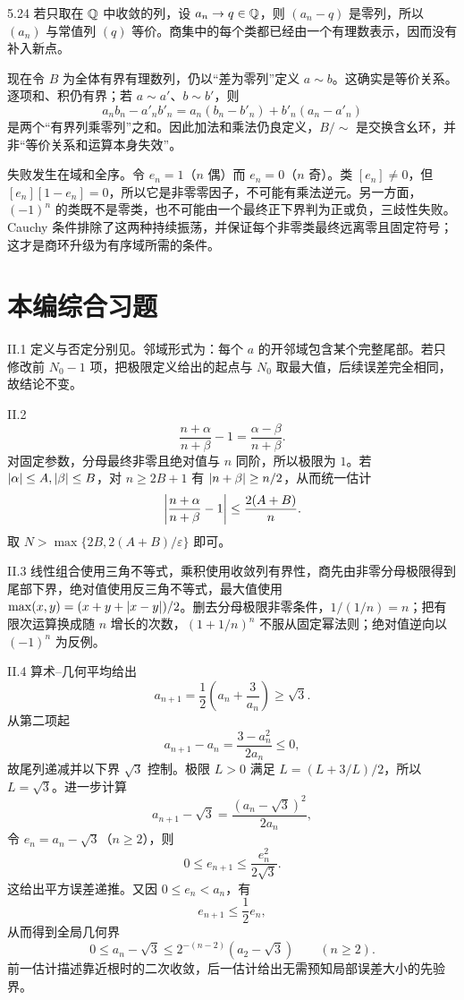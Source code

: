 \begin{solution}{5.24}
若只取在 \(\mathbb{Q}\) 中收敛的列，设 \(a_n\to q\in\mathbb{Q}\)，则
\((a_n-q)\) 是零列，所以 \((a_n)\) 与常值列 \((q)\) 等价。商集中的每个类都已经由一个有理数表示，因而没有补入新点。

现在令 \(B\) 为全体有界有理数列，仍以“差为零列”定义 \(a\sim b\)。这确实是等价关系。逐项和、积仍有界；若
\(a\sim a'\)、\(b\sim b'\)，则
\[
 a_nb_n-a'_nb'_n
 =a_n(b_n-b'_n)+b'_n(a_n-a'_n)
\]
是两个“有界列乘零列”之和。因此加法和乘法仍良定义，\(B/\!\sim\) 是交换含幺环，并非“等价关系和运算本身失效”。

失败发生在域和全序。令 \(e_n=1\)（\(n\) 偶）而
\(e_n=0\)（\(n\) 奇）。类 \([e_n]\ne0\)，但
\([e_n][1-e_n]=0\)，所以它是非零零因子，不可能有乘法逆元。另一方面，\((-1)^n\) 的类既不是零类，也不可能由一个最终正下界判为正或负，三歧性失败。Cauchy 条件排除了这两种持续振荡，并保证每个非零类最终远离零且固定符号；这才是商环升级为有序域所需的条件。
\end{solution}

\section*{本编综合习题}

\begin{solution}{II.1}
定义与否定分别见。邻域形式为：每个 \(a\) 的开邻域包含某个完整尾部。若只修改前 \(N_0-1\) 项，把极限定义给出的起点与 \(N_0\) 取最大值，后续误差完全相同，故结论不变。
\end{solution}

\begin{solution}{II.2}
\[
 \frac{n+\alpha}{n+\beta}-1=\frac{\alpha-\beta}{n+\beta}.
\]
对固定参数，分母最终非零且绝对值与 \(n\) 同阶，所以极限为 \(1\)。若
\(\left|\alpha\right|\le A,\left|\beta\right|\le B\)，对 \(n\ge2B+1\) 有
\(\left|n+\beta\right|\ge n/2\)，从而统一估计
\[
 \left|\frac{n+\alpha}{n+\beta}-1\right|
 \le\frac{2(A+B)}n.
\]
取 \(N>\max\{2B,2(A+B)/\varepsilon\}\) 即可。
\end{solution}

\begin{solution}{II.3}
线性组合使用三角不等式，乘积使用收敛列有界性，商先由非零分母极限得到尾部下界，绝对值使用反三角不等式，最大值使用
\(\max(x,y)=(x+y+\left|x-y\right|)/2\)。删去分母极限非零条件，\(1/(1/n)=n\)；把有限次运算换成随 \(n\) 增长的次数，\((1+1/n)^n\) 不服从固定幂法则；绝对值逆向以 \((-1)^n\) 为反例。
\end{solution}

\begin{solution}{II.4}
算术--几何平均给出
\[
 a_{n+1}=\frac12\left(a_n+\frac3{a_n}\right)\ge\sqrt3.
\]
从第二项起
\[
 a_{n+1}-a_n=\frac{3-a_n^2}{2a_n}\le0,
\]
故尾列递减并以下界 \(\sqrt3\) 控制。极限 \(L>0\) 满足
\(L=(L+3/L)/2\)，所以 \(L=\sqrt3\)。进一步计算
\[
 a_{n+1}-\sqrt3
 =\frac{(a_n-\sqrt3)^2}{2a_n},
\]
令 \(e_n=a_n-\sqrt3\)（\(n\ge2\)），则
\[
 0\le e_{n+1}\le\frac{e_n^2}{2\sqrt3}.
\]
这给出平方误差递推。又因 \(0\le e_n<a_n\)，有
\[
 e_{n+1}\le\frac12e_n,
\]
从而得到全局几何界
\[
 0\le a_n-\sqrt3\le2^{-(n-2)}(a_2-\sqrt3)
 \qquad(n\ge2).
\]
前一估计描述靠近根时的二次收敛，后一估计给出无需预知局部误差大小的先验界。
\end{solution}

